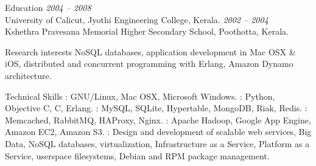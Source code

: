 \documentclass{resume}
\author{Sreejith Kesavan}
\begin{document}
\maketitle


\begin{category}{Education}
 \hfill {\em 2004 -- 2008}\\
University of Calicut, Jyothi Engineering College, Kerala.
 \hfill {\em 2002 -- 2004}\\
Kshethra Pravesana Memorial Higher Secondary School, Poothotta, Kerala.
\end{category}


\begin{category}{Research interests}
\citemnobullet NoSQL databases, application development in Mac OSX \& iOS, 
distributed and concurrent programming with Erlang, Amazon Dynamo architecture.
\end{category}

\begin{category}{Technical Skills}
: GNU/Linux, Mac OSX, Microsoft Windows.
: Python, Objective C, C, Erlang.
: MySQL, SQLite, Hypertable, MongoDB, Riak, Redis.
: Memcached, RabbitMQ, HAProxy, Nginx.
: Apache Hadoop, Google App Engine, Amazon EC2, Amazon S3.
: Design and development of scalable web services, Big Data, 
NoSQL databases, virtualization, Infrastructure as a Service, Platform as a Service, 
userspace filesystems, Debian and RPM package management.
\end{category}

\end{document}
